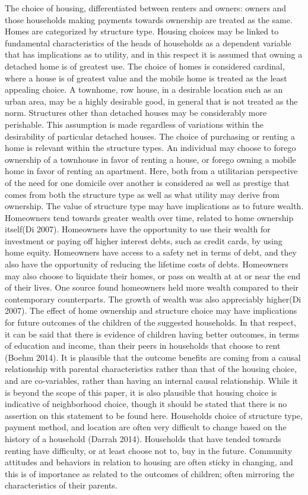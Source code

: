 \documentclass{article}
\begin{document}
The choice of housing, differentiated between renters and owners: owners and those households making payments towards ownership are treated as the same.  Homes are categorized by structure type.   
Housing choices may be linked to fundamental characteristics of the heads of households as a dependent variable that has implications as to utility, and in this respect it is assumed that owning a detached home is of greatest use.  The choice of homes is considered cardinal, where a house is of greatest value and the mobile home is treated as the least appealing choice.  A townhome, row house, in a desirable location such as an urban area, may be a highly desirable good, in general that is not treated as the norm. Structures other than detached houses may be considerably more perishable.  This assumption is made regardless of variations within the desirability of particular detached houses. The choice of purchasing or renting a home is relevant within the structure types.  An individual may choose to forego ownership of a townhouse in favor of renting a house, or forego owning a mobile home in favor of renting an apartment.  Here, both from a utilitarian perspective of the need for one domicile over another is considered as well as prestige that comes from both the structure type as well as what utility may derive from ownership.
	The value of structure type may have implications as to future wealth.  Homeowners tend towards greater wealth over time, related to home ownership itself(Di 2007).  Homeowners have the opportunity to use their wealth for investment or paying off higher interest debts, such as credit cards, by using home equity.  Homeowners have access to a safety net in terms of debt, and they also have the opportunity of reducing the lifetime costs of debts.  Homeowners may also choose to liquidate their homes, or pass on wealth at at or near the end of their lives.  One source found homeowners held more wealth compared to their contemporary counterparts.  The growth of wealth was also appreciably higher(Di 2007). 
The effect of home ownership and structure choice may have implications for future outcomes of the children of the suggested households.  In that respect, it can be said that there is evidence of children having better outcomes, in terms of education and income, than their peers in households that choose to rent (Boehm 2014).  It is plausible that the outcome benefits are coming from a causal relationship with parental characteristics rather than that of the housing choice, and are co-variables, rather than having an internal causal relationship.  While it is beyond the scope of this paper, it is also plausible that housing choice is indicative of neighborhood choice, though it should be stated that there is no assertion on this statement to be found here.
Households choice of structure type, payment method, and location are often very difficult to change based on the history of a household (Darrah 2014).  Households that have tended towards renting have difficulty, or at least choose not to, buy in the future.  Community attitudes and behaviors in relation to housing are often sticky in changing, and this is of importance as related to the outcomes of children; often mirroring the characteristics of their parents.  
\end{document}
